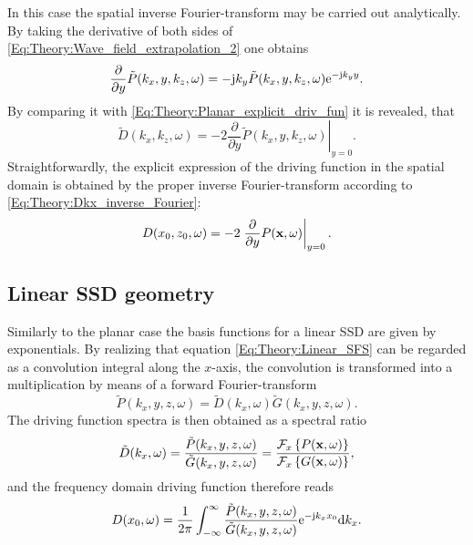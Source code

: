 \vspace{3mm}
In this case the spatial inverse Fourier-transform may be carried out analytically.
By taking the derivative of both sides of \eqref{Eq:Theory:Wave_field_extrapolation_2} one obtains
\begin{equation}
\frac{\partial}{\partial y}  \tilde{P}(k_x,y,k_z,\omega) = - \mathrm{j} k_y  \tilde{P}(k_x,y,k_z,\omega) \mathrm{e}^{-\mathrm{j} k_y y}.
\end{equation}
By comparing it with \eqref{Eq:Theory:Planar_explicit_driv_fun} it is revealed, that 
\begin{equation}
\tilde{D}(k_x,k_z,\omega) = -2 \left. \frac{\partial}{\partial y} \tilde{P}(k_x,y,k_z,\omega) \right|_{y = 0}.
\label{Eq:Theory:Planar_explicit_driv_fun_spatial}
\end{equation}
Straightforwardly, the explicit expression of the driving function in the spatial domain is obtained by the proper inverse Fourier-transform according to \eqref{Eq:Theory:Dkx_inverse_Fourier}:
\begin{equation}
D(x_0,z_0,\omega) = -2 \left. \frac{\partial}{\partial y} P(\mathbf{x},\omega) \right|_{y = 0}.
\label{Eq:Theory:Planar_explicit_driv_fun_spatial}
\end{equation}

\subsection{Linear SSD geometry}

Similarly to the planar case the basis functions for a linear SSD are given by exponentials.
By realizing that equation \eqref{Eq:Theory:Linear_SFS} can be regarded as a convolution integral along the $x$-axis,
the convolution is transformed into a multiplication by means of a forward Fourier-transform
\begin{equation}
\tilde{P}(k_x,y,z, \omega) = \tilde{D}(k_x,\omega)\tilde{G}(k_x,y,z, \omega).
\end{equation}
The driving function spectra is then obtained as a spectral ratio
\begin{equation}
\tilde{D}(k_x,\omega) = \frac{\tilde{P}(k_x,y,z, \omega)}{\tilde{G}(k_x,y,z, \omega)} = \frac{\mathcal{F}_x\left\{ P(\mathbf{x},\omega) \right\}}{\mathcal{F}_x\left\{ G(\mathbf{x},\omega) \right\}},
\end{equation}
and the frequency domain driving function therefore reads
\begin{equation}
D(x_0,\omega) = \frac{1}{2\pi} \int_{-\infty}^{\infty} \frac{\tilde{P}(k_x,y,z, \omega) }{\tilde{G}(k_x,y,z, \omega)} \mathrm{e}^{-\mathrm{j} k_x x_0} \mathrm{d} k_x.
\label{Eq:Theory:LinearSDM1}
\end{equation}

